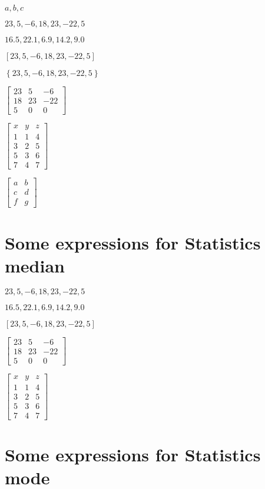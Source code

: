\documentclass{article}
\begin{document}
$a,b,c$

$23,5,-6,18,23,-22,5$

$16.5,22.1,6.9,14.2,9.0$

$\left[ 23,5,-6,18,23,-22,5\right] $

$\left\{ 23,5,-6,18,23,-22,5\right\} $

$\left[ 
\begin{array}{ccc}
23 & 5 & -6 \\ 
18 & 23 & -22 \\ 
5 & 0 & 0%
\end{array}%
\right] $

$\left[ 
\begin{array}{ccc}
x & y & z \\ 
1 & 1 & 4 \\ 
3 & 2 & 5 \\ 
5 & 3 & 6 \\ 
7 & 4 & 7%
\end{array}%
\right] $

$\left[ 
\begin{array}{cc}
a & b \\ 
c & d \\ 
f & g%
\end{array}%
\right] $

\section{Some expressions for Statistics median}

$23,5,-6,18,23,-22,5$

$16.5,22.1,6.9,14.2,9.0$

$\left[ 23,5,-6,18,23,-22,5\right] $

$\left[ 
\begin{array}{ccc}
23 & 5 & -6 \\ 
18 & 23 & -22 \\ 
5 & 0 & 0%
\end{array}%
\right] $

$\left[ 
\begin{array}{ccc}
x & y & z \\ 
1 & 1 & 4 \\ 
3 & 2 & 5 \\ 
5 & 3 & 6 \\ 
7 & 4 & 7%
\end{array}%
\right] $

\section{Some expressions for Statistics mode}
\end{document}
